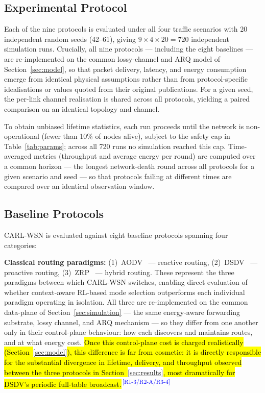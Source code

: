\documentclass[12pt]{article}
\newcommand{\rtag}[1]{\textsuperscript{\textcolor{blue}{\scriptsize\,[#1]}}}
\newcommand{\hlx}[1]{{\exhyphenpenalty=10000\hyphenpenalty=10000\let\ \nobreakspace\hl{#1}}}
\begin{document}
\subsection{Experimental Protocol}

Each of the nine protocols is evaluated under all four traffic
scenarios with 20 independent random seeds (42--61), giving
$9 \times 4 \times 20 = 720$ independent simulation runs. Crucially,
all nine protocols --- including the eight baselines --- are
re-implemented on the common lossy-channel and ARQ model of
Section~\ref{sec:model}, so that packet delivery, latency, and energy
consumption emerge from identical physical assumptions rather than
from protocol-specific idealisations or values quoted from their
original publications. For a given seed, the per-link channel
realisation is shared across all protocols, yielding a paired
comparison on an identical topology and channel.

To obtain unbiased lifetime statistics, each run proceeds until the
network is non-operational (fewer than 10\% of nodes alive), subject
to the safety cap in Table~\ref{tab:params}; across all 720 runs no
simulation reached this cap. Time-averaged metrics (throughput and
average energy per round) are computed over a common horizon --- the
longest network-death round across all protocols for a given scenario
and seed --- so that protocols failing at different times are compared
over an identical observation window.

\subsection{Baseline Protocols}

CARL-WSN is evaluated against eight baseline protocols spanning
four categories:

\textbf{Classical routing paradigms:}
(1)~AODV~\cite{perkins1999} --- reactive routing,
(2)~DSDV~\cite{perkins1994} --- proactive routing,
(3)~ZRP~\cite{haas2001} --- hybrid routing.
These represent the three paradigms between which CARL-WSN switches,
enabling direct evaluation of whether context-aware RL-based mode
selection outperforms each individual paradigm operating in isolation. All three are re-implemented on the common data-plane of
Section~\ref{sec:simulation} --- the same energy-aware forwarding substrate, lossy channel, and
ARQ mechanism --- so they differ from one another only in their
control-plane behaviour: how each discovers and maintains routes, and
at what energy cost. \hlx{Once this control-plane cost is charged
realistically (Section~}\ref{sec:model}\hlx{), this difference is far from cosmetic: it
is directly responsible for the substantial divergence in lifetime,
delivery, and throughput observed between the three protocols in
Section~}\ref{sec:results}\hlx{, most dramatically for DSDV's periodic full-table
broadcast.}\rtag{R1-3/R2-A/R3-4}
\end{document}
